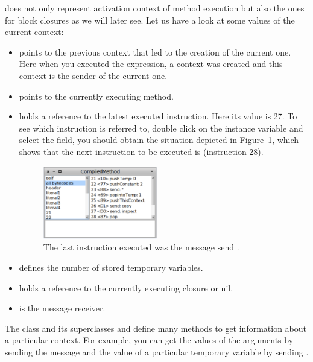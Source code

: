 \documentclass[a4paper,10pt,twoside]{book}
\begin{document}
 does not only represent activation context of method execution but also
the ones for block closures as we will later see. Let us have a look at some values of the current context:

\begin{itemize}
\item {} points to the previous context that led to the creation of the current one. Here when you executed the expression, a context was created and this context is the sender of the current one.

\item {} points to the currently executing method.

\item {} holds a reference to the latest executed instruction. Here its value is 27. To see which instruction is referred to, double click on the  instance variable and select the  field, you should obtain the situation depicted in Figure~\ref{ByteCodes}, which shows that the next instruction to be executed is  (instruction 28).

\begin{figure}[b]
  \begin{center}\includegraphics[width=5cm]{ByteCodes}
    \caption{The last instruction executed was the message send .\label{ByteCodes}}
  \end{center}
\end{figure}

\item {} defines the number of stored temporary variables.

\item {} holds a reference to the currently executing closure or nil.

\item {} is the message receiver.
\end{itemize}

The class  and its superclasses  and  define many methods to get information about a particular context. For example, you can get the values of the arguments by sending the  message and the value of a particular temporary variable by sending .
\end{document}
